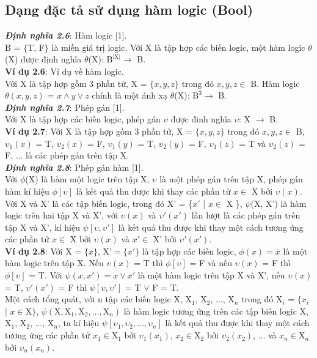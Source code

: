 \documentclass[a4paper,13pt,oneside,openany]{book}
\begin{document}
\begin{flushleft}
		\section{Dạng đặc tả sử dụng hàm logic (Bool)}
		\textbf{\textit{Định nghĩa 2.6}}: Hàm logic [1].\\
		B = $\{$T, F$\}$ là miền giá trị logic. Với X là tập hợp các biến logic, một hàm logic $\theta$(X) được định nghĩa $\theta$(X): $\textrm{B}^\textrm{{|X|}} \rightarrow$ B.\\
		\textbf{Ví dụ 2.6}: Ví dụ về hàm logic.\\
		Với X là tập hợp gồm 3 phần tử, X = $\{x, y, z\}$ trong đó $x, y, z \in$ B. Hàm logic $\theta(x, y, z)$ = $x \land y \lor z$ chính là một ánh xạ $\theta$(X): $\textrm{B}^3 \rightarrow$ B.\\
		\textbf{\textit{Định nghĩa 2.7}}: Phép gán [1].\\
		Với X là tập hợp các biến logic, phép gán $\upsilon$ được đinh nghĩa $\upsilon$: X $\rightarrow$ B.\\
		\textbf{Ví dụ 2.7}: Với X là tập hợp gồm 3 phần tử, X = $\{x, y, z\}$ trong đó $x, y, z \in$ B, $\upsilon_1(x)$ = T, $\upsilon_2(x)$ = F, $\upsilon_1(y)$ = T, $\upsilon_2(y)$ = F, $\upsilon_1(z)$ = T và $\upsilon_2(z)$ = F, ... là các phép gán trên tập X.\\
		\textbf{\textit{Định nghĩa 2.8}}: Phép gán hàm [1].\\
		Với $\phi$(X) là hàm một logic trên tập X, $\upsilon$ là một phép gán trên tập X, phép gán hàm kí hiệu $\phi[\upsilon]$ là kết quả thu được khi thay các phần tử $x \in$ X bởi $\upsilon(x)$.
		Với X và $\textrm{X'}$ là các tập biến logic, trong đó $\textrm{X'}$ = \{$x'$ | $x \in$ X \}, $\psi$(X, $\textrm{X'}$) là hàm logic trên hai tập X và $\textrm{X'}$, với $\upsilon(x)$ và $\upsilon'(x')$ lần lượt là các phép gán trên tập X và $\textrm{X'}$, kí hiệu $\psi[\upsilon, \upsilon']$ là kết quả thu được khi thay một cách tương ứng các phần tử $x \in$ X bởi $\upsilon(x)$ và $x' \in$ $\textrm{X'}$ bởi $\upsilon'(x')$.\\
		\textbf{Ví dụ 2.8}: Với X = $\{x\}$, $\textrm{X'} = \{x'\}$ là tập hợp các biến logic, $\phi(x) = \overline{x}$ là một hàm logic trên tập X. Nếu $\upsilon(x)$ = T thì $\phi[\upsilon]$ = F và nếu $\upsilon(x)$ = F thì $\phi[\upsilon]$ = T. Với $\psi(x, x') = x \lor x'$ là một hàm logic trên tập X và $\textrm{X'}$, nếu $\upsilon(x)$ = T, $\upsilon'(x')$ = F thì $\psi[\upsilon, \upsilon']$ = T $\lor$ F = T.\\
		Một cách tổng quát, với n tập các biến logic X, $\textrm{X}_1$, $\textrm{X}_2$, ..., $\textrm{X}_n$ trong đó $\textrm{X}_i$ = $\{x_i$ | $x \in \textrm{X}\}$, $\psi(\textrm{X}, \textrm{X}_1, \textrm{X}_2, ..., \textrm{X}_n)$ là hàm logic tương ứng trên các tập biến logic X, $\textrm{X}_1$, $\textrm{X}_2$, ..., $\textrm{X}_n$, ta kí hiệu $\psi[\upsilon_1, \upsilon_2, ..., \upsilon_n]$ là kết quả thu được khi thay một cách tương ứng các phần tử $x_1 \in \textrm{X}_1$ bởi $\upsilon_1(x_1)$, $x_2 \in \textrm{X}_2$ bởi $\upsilon_2(x_2)$, ... và $x_n \in \textrm{X}_n$ bởi $\upsilon_n(x_n)$.\\

\end{flushleft}
\end{document}
